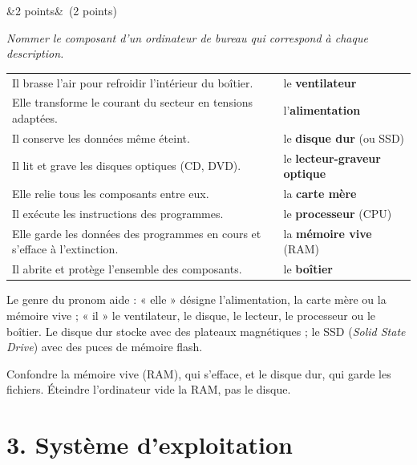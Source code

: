 \documentclass[11pt, a4paper]{exam}
\newcommand{\Q}[3]{\par\needspace{5\baselineskip}\bigskip\noindent{\large\bfseries Question #1}\ifx&#2&\else\ \textnormal{(#2)}\fi\par\nopagebreak\smallskip\noindent\textit{#3}\par\nopagebreak\smallskip}
\begin{document}
\Q{5}{2 points}{Nommer le composant d'un ordinateur de bureau qui correspond à chaque description.}
\begin{reponse}
\renewcommand{\arraystretch}{1.15}
\begin{tabular}{@{}p{10.3cm}l@{}}
Il brasse l'air pour refroidir l'intérieur du boîtier. & le \textbf{ventilateur} \\
Elle transforme le courant du secteur en tensions adaptées. & l'\textbf{alimentation} \\
Il conserve les données même éteint. & le \textbf{disque dur} (ou SSD) \\
Il lit et grave les disques optiques (CD, DVD). & le \textbf{lecteur-graveur optique} \\
Elle relie tous les composants entre eux. & la \textbf{carte mère} \\
Il exécute les instructions des programmes. & le \textbf{processeur} (CPU) \\
Elle garde les données des programmes en cours et s'efface à l'extinction. & la \textbf{mémoire vive} (RAM) \\
Il abrite et protège l'ensemble des composants. & le \textbf{boîtier} \\
\end{tabular}
\end{reponse}
Le genre du pronom aide : « elle » désigne l'alimentation, la carte mère ou la mémoire vive ; « il » le ventilateur, le disque, le lecteur, le processeur ou le boîtier. Le disque dur stocke avec des plateaux magnétiques ; le SSD (\emph{Solid State Drive}) avec des puces de mémoire flash.
\begin{erreur}
Confondre la mémoire vive (RAM), qui s'efface, et le disque dur, qui garde les fichiers. Éteindre l'ordinateur vide la RAM, pas le disque.
\end{erreur}

\section*{3. Système d'exploitation}
\end{document}
